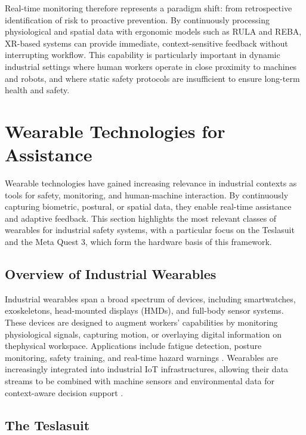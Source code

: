 Real-time monitoring therefore represents a paradigm shift: from retrospective identification of risk to proactive prevention. By continuously processing physiological and spatial data with ergonomic models such as RULA and REBA, XR-based systems can provide immediate, context-sensitive feedback without interrupting workflow. This capability is particularly important in dynamic industrial settings where human workers operate in close proximity to machines and robots, and where static safety protocols are insufficient to ensure long-term health and safety.


\section{Wearable Technologies for Assistance}
Wearable technologies have gained increasing relevance in industrial contexts as tools for safety, monitoring, and human-machine interaction. By continuously capturing biometric, postural, or spatial data, they enable real-time assistance and adaptive feedback. This section highlights the most relevant classes of wearables for industrial safety systems, with a particular focus on the Teslasuit and the Meta Quest 3, which form the hardware basis of this framework.

\subsection{Overview of Industrial Wearables}

Industrial wearables span a broad spectrum of devices, including smartwatches, exoskeletons, head-mounted displays (HMDs), and full-body sensor systems. These devices are designed to augment workers’ capabilities by monitoring physiological signals, capturing motion, or overlaying digital information on thephysical workspace. Applications include fatigue detection, posture monitoring, safety training, and real-time hazard warnings \cite{de2019industrialwearables,syberfeldt2016vrar}. Wearables are increasingly integrated into industrial IoT infrastructures, allowing their data streams to be combined with machine sensors and environmental data for context-aware decision support \cite{portman2022xrsurvey}.

\subsection{The Teslasuit}

